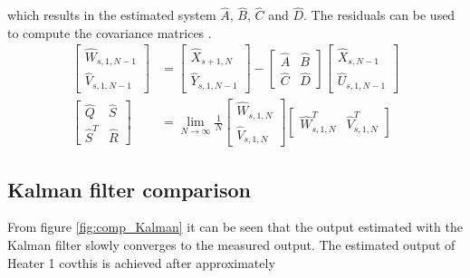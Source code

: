 which results in the estimated system $\hat{A}$, $\hat{B}$, $\hat{C}$ and $\hat{D}$. The residuals can be used to compute the covariance matrices \cite[p.~333]{FilteringIdentification}.
\begin{align*}
    \begin{bmatrix} \hat{W}_{s,1,N-1} \\ \hat{V}_{s,1,N-1} \end{bmatrix} &= \begin{bmatrix} \hat{X}_{s+1,N} \\ \hat{Y}_{s,1,N-1} \end{bmatrix} - \begin{bmatrix} \hat{A} & \hat{B}\\ \hat{C} & \hat{D} \end{bmatrix} \begin{bmatrix} \hat{X}_{s,N-1} \\ \hat{U}_{s,1,N-1} \end{bmatrix} \\
    \begin{bmatrix} \hat{Q} & \hat{S}\\ \hat{S}^T & \hat{R} \end{bmatrix} &= \lim_{N \xrightarrow{}\infty} \frac{1}{N} \begin{bmatrix} \hat{W}_{s,1,N} \\ \hat{V}_{s,1,N} \end{bmatrix} \begin{bmatrix} \hat{W}_{s,1,N}^T & \hat{V}_{s,1,N}^T \end{bmatrix}
\end{align*}

\subsection{Kalman filter comparison}
From figure \ref{fig:comp_Kalman} it can be seen that the output estimated with the Kalman filter slowly converges to the measured output. The estimated output of Heater 1 covthis is achieved after approximately     

